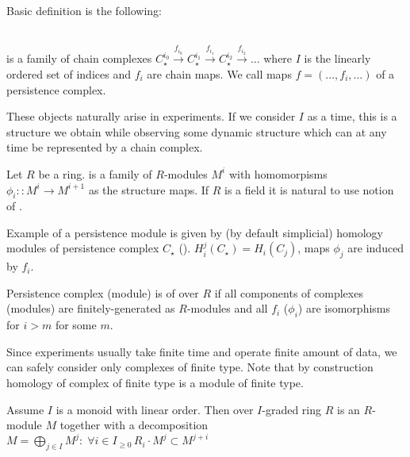 Basic definition is the following:

\begin{definition} {\cite[Definition 3.1]{Zomorodian05}}\\
   is a family of chain complexes $C_{\star}^{i_0} \xrightarrow{f_{i_0}} C_{\star}^{i_1} \xrightarrow{f_{i_1}} C_{\star}^{i_2} \xrightarrow{f_{i_2}} \ldots$ where $I$ is the linearly ordered set of indices and $f_i$ are chain maps. We call maps $f=(\ldots,f_i,\ldots)$  of a persistence complex.
\end{definition}

These objects naturally arise in experiments. If we consider $I$ as a time, this is a structure we obtain while observing some dynamic structure which can at any time be represented by a chain complex.\\

\begin{definition}
  Let $R$ be a ring.  is a family of $R$-modules $M^i$ with homomorpisms $\phi_i :: M^i \to M^{i+1}$ as the structure maps. If $R$ is a field it is natural to use notion of .
\end{definition}

Example of a persistence module is given by (by default simplicial) homology modules of persistence complex $C_{\star}$ (). $H_i^j(C_{\star}) = H_i(C_{j})$, maps $\phi_j$ are induced by $f_i$.\\

\begin{definition}
  Persistence complex (module) is of  over $R$ if all components of complexes (modules) are finitely-generated as $R$-modules and all $f_i$ ($\phi_i$) are isomorphisms for $i > m$ for some $m$.
\end{definition}

Since experiments usually take finite time and operate finite amount of data, we can safely consider only complexes of finite type. Note that by construction homology of complex of finite type is a module of finite type.\\

\begin{definition}
  Assume $I$ is a monoid with linear order. Then  over $I$-graded ring $R$ is an $R$-module $M$ together with a decomposition $M = \bigoplus_{j \in I} M^j:\; \forall i \in I_{\geq 0}\, R_i \cdot M^j \subset M^{j+i}$
\end{definition}

